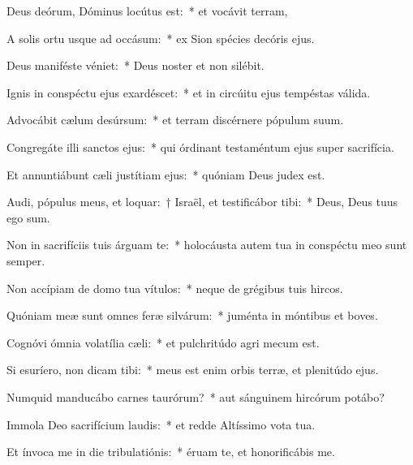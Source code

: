 \item Deus deórum, Dóminus locútus est:~* et vocávit terram,

\item A solis ortu usque ad occásum:~* ex Sion spécies decóris ejus.

\item Deus maniféste véniet:~* Deus noster et non silébit.

\item Ignis in conspéctu ejus exardéscet:~* et in circúitu ejus tempéstas válida.

\item Advocábit cælum desúrsum:~* et terram discérnere pópulum suum.

\item Congregáte illi sanctos ejus:~* qui órdinant testaméntum ejus super sacrifícia.

\item Et annuntiábunt cæli justítiam ejus:~* quóniam Deus judex est.

\item Audi, pópulus meus, et loquar:~† Israël, et testificábor tibi:~* Deus, Deus tuus ego sum.

\item Non in sacrifíciis tuis árguam te:~* holocáusta autem tua in conspéctu meo sunt semper.

\item Non accípiam de domo tua vítulos:~* neque de grégibus tuis hircos.

\item Quóniam meæ sunt omnes feræ silvárum:~* juménta in móntibus et boves.

\item Cognóvi ómnia volatília cæli:~* et pulchritúdo agri mecum est.

\item Si esuríero, non dicam tibi:~* meus est enim orbis terræ, et plenitúdo ejus.

\item Numquid manducábo carnes taurórum?~* aut sánguinem hircórum potábo?

\item Immola Deo sacrifícium laudis:~* et redde Altíssimo vota tua.

\item Et ínvoca me in die tribulatiónis:~* éruam te, et honorificábis me.
